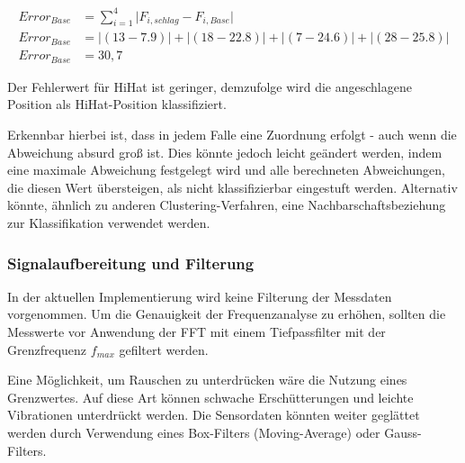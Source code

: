 \begin{align*}
Error_{Base} &= \sum_{i=1}^{4} \lvert F_{i,schlag} - F_{i,Base}\rvert \\
Error_{Base} &= \lvert (13-7.9)\rvert + \lvert(18-22.8)\rvert + \lvert(7-24.6)\rvert + \lvert(28-25.8)\rvert \\
Error_{Base} &= 30,7
\end{align*}

Der Fehlerwert für HiHat ist geringer, demzufolge wird die angeschlagene Position als HiHat-Position klassifiziert.
 
Erkennbar hierbei ist, dass in jedem Falle eine Zuordnung erfolgt - auch wenn die Abweichung absurd groß ist. Dies könnte jedoch leicht geändert werden, indem eine maximale Abweichung festgelegt wird und alle berechneten Abweichungen, die diesen Wert übersteigen, als nicht klassifizierbar eingestuft werden. Alternativ könnte, ähnlich zu anderen Clustering-Verfahren, eine Nachbarschaftsbeziehung zur Klassifikation verwendet werden.

\subsubsection*{Signalaufbereitung und Filterung}

In der aktuellen Implementierung wird keine Filterung der Messdaten vorgenommen. 
Um die Genauigkeit der Frequenzanalyse zu erhöhen, sollten die Messwerte vor Anwendung der FFT mit einem Tiefpassfilter mit der Grenzfrequenz $f_{max}$ gefiltert werden.

Eine Möglichkeit, um Rauschen zu unterdrücken wäre die Nutzung eines Grenzwertes. Auf diese Art können schwache Erschütterungen und leichte Vibrationen unterdrückt werden.
Die Sensordaten könnten weiter geglättet werden durch Verwendung eines Box-Filters (Moving-Average) oder Gauss-Filters.




